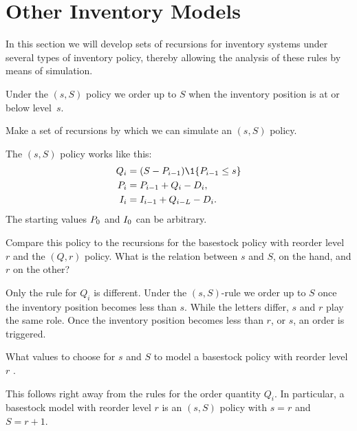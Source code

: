 \section{Other Inventory Models}
\label{sec:other-invent-models}


In this section we will develop sets of recursions for inventory systems under several types of inventory policy, thereby allowing the analysis of these rules by means of simulation.

Under the $(s,S)$ policy we order up to $S$ when the inventory position is at or below level~$s$. 
\begin{exercise}
  Make a set of recursions by which we can simulate an $(s,S)$ policy.
  \begin{solution}
The $(s,S)$ policy works like this: 
\begin{align*}
  Q_i &= (S-\IP_{i-1}) \1{\IP_{i-1}\leq s} \\
  \IP_{i} &= \IP_{i-1} + Q_{i} - D_i, \\
  \IL_{i} &= \IL_{i-1} + Q_{i-L} - D_i.
\end{align*}
The starting values $P_0$ and $I_0$ can be arbitrary.
  \end{solution}
\end{exercise}

\begin{exercise}
  Compare this policy to the recursions for the basestock policy with reorder level~$r$ and the $(Q,r)$ policy. What is the relation between $s$ and $S$, on the hand, and $r$ on the other?
  \begin{solution}
    Only the rule for $Q_i$ is different. Under the $(s,S)$-rule we order up to $S$ once the inventory position becomes less than $s$. While the letters differ, $s$ and $r$ play the same role. Once the inventory position becomes less than $r$, or $s$, an order is triggered.
  \end{solution}
\end{exercise}

\begin{exercise}
  What values to choose for $s$ and $S$ to model a basestock policy with reorder level $r$ .
  \begin{solution}
    This follows right away from the rules for the order quantity $Q_i$. In particular, a basestock model with reorder level $r$ is an $(s,S)$ policy with $s=r$ and $S=r+1$. 
  \end{solution}
\end{exercise}

